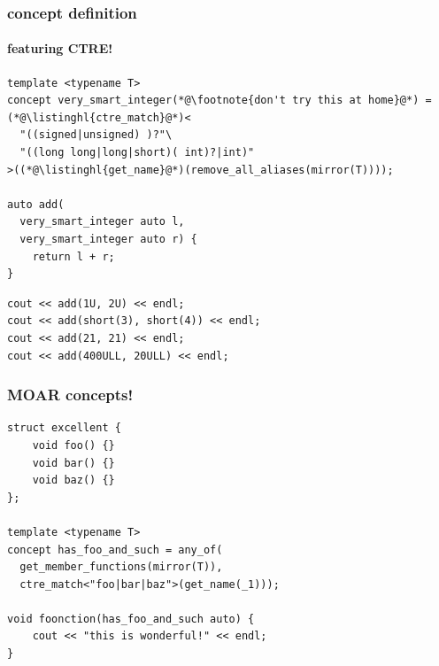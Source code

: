 \documentclass[compress,table,xcolor=table]{beamer}
\begin{document}
\begin{frame}[fragile]
  \frametitle{ concept definition}
  \framesubtitle{featuring CTRE!}
  \begin{lstlisting}[language=c++2x,basicstyle=\footnotesize\ttfamily]
template <typename T>
concept very_smart_integer(*@\footnote{don't try this at home}@*) = (*@\listinghl{ctre_match}@*)<
  "((signed|unsigned) )?"\
  "((long long|long|short)( int)?|int)"
>((*@\listinghl{get_name}@*)(remove_all_aliases(mirror(T))));

auto add(
  very_smart_integer auto l,
  very_smart_integer auto r) {
    return l + r;
}
  \end{lstlisting}
  \begin{lstlisting}[language=c++2x,basicstyle=\small\ttfamily]
cout << add(1U, 2U) << endl;
cout << add(short(3), short(4)) << endl;
cout << add(21, 21) << endl;
cout << add(400ULL, 20ULL) << endl;
  \end{lstlisting}
\end{frame}
\begin{frame}[fragile]
  \frametitle{MOAR  concepts!}
  \begin{lstlisting}[language=c++2x,basicstyle=\small\ttfamily]
struct excellent {
    void foo() {}
    void bar() {}
    void baz() {}
};

template <typename T>
concept has_foo_and_such = any_of(
  get_member_functions(mirror(T)),
  ctre_match<"foo|bar|baz">(get_name(_1)));

void foonction(has_foo_and_such auto) {
    cout << "this is wonderful!" << endl;
}
  \end{lstlisting}
\end{frame}
\end{document}
